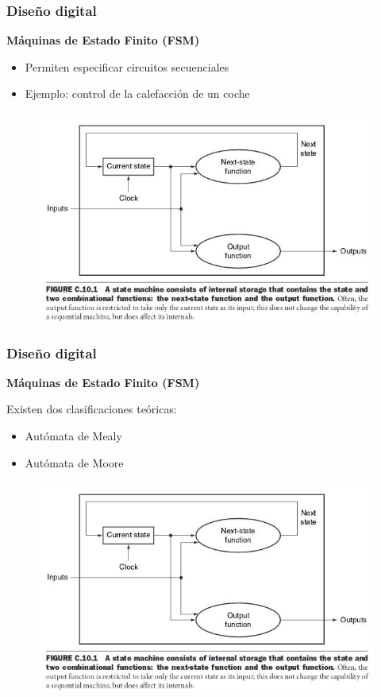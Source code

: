 \documentclass[aspectratio=169,compress]{beamer}
\begin{document}
\begin{footnotesize}
\begin{frame}[fragile]
\frametitle{Diseño digital}
\begin{center}\textbf{Máquinas de Estado Finito (FSM)}\end{center}
\begin{itemize}
\item Permiten especificar circuitos secuenciales
\item Ejemplo: control de la calefacción de un coche
\end{itemize}
\begin{figure}
\includegraphics[scale=0.4]{images/fsm1.jpg} 
\end{figure}
\end{frame}


\begin{frame}[fragile]
\frametitle{Diseño digital}
\begin{center}\textbf{Máquinas de Estado Finito (FSM)}\end{center}
Existen dos clasificaciones teóricas:
\begin{itemize}
\item Autómata de Mealy
\item Autómata de Moore
\end{itemize}
\begin{figure}
\includegraphics[scale=0.4]{images/fsm1.jpg} 
\end{figure}
\end{frame}




\end{footnotesize}
\end{document}
